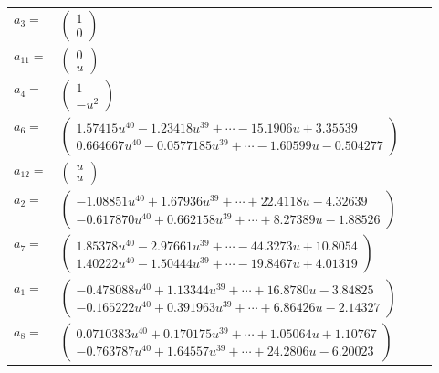 \documentclass[1p]{elsarticle_modified}
\theoremstyle{definition}
\begin{document}
\begin{tabular}{m{7pt} m{180pt} m{7pt} m{180pt} }
\flushright $a_{3}=$&$\begin{pmatrix}1\\0\end{pmatrix}$ \\
\flushright $a_{11}=$&$\begin{pmatrix}0\\u\end{pmatrix}$ \\
\flushright $a_{4}=$&$\begin{pmatrix}1\\- u^2\end{pmatrix}$ \\
\flushright $a_{6}=$&$\begin{pmatrix}1.57415 u^{40}-1.23418 u^{39}+\cdots-15.1906 u+3.35539\\0.664667 u^{40}-0.0577185 u^{39}+\cdots-1.60599 u-0.504277\end{pmatrix}$ \\
\flushright $a_{12}=$&$\begin{pmatrix}u\\u\end{pmatrix}$ \\
\flushright $a_{2}=$&$\begin{pmatrix}-1.08851 u^{40}+1.67936 u^{39}+\cdots+22.4118 u-4.32639\\-0.617870 u^{40}+0.662158 u^{39}+\cdots+8.27389 u-1.88526\end{pmatrix}$ \\
\flushright $a_{7}=$&$\begin{pmatrix}1.85378 u^{40}-2.97661 u^{39}+\cdots-44.3273 u+10.8054\\1.40222 u^{40}-1.50444 u^{39}+\cdots-19.8467 u+4.01319\end{pmatrix}$ \\
\flushright $a_{1}=$&$\begin{pmatrix}-0.478088 u^{40}+1.13344 u^{39}+\cdots+16.8780 u-3.84825\\-0.165222 u^{40}+0.391963 u^{39}+\cdots+6.86426 u-2.14327\end{pmatrix}$ \\
\flushright $a_{8}=$&$\begin{pmatrix}0.0710383 u^{40}+0.170175 u^{39}+\cdots+1.05064 u+1.10767\\-0.763787 u^{40}+1.64557 u^{39}+\cdots+24.2806 u-6.20023\end{pmatrix}$ \\

\end{tabular}
\end{document}

